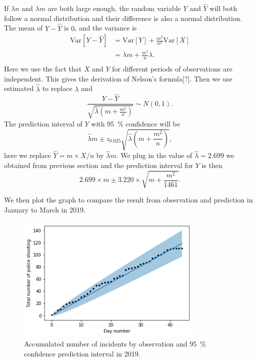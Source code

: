 \documentclass[11pt,a4paper,english]{article}
\begin{document}
If $\lambda n$ and $\lambda m$ are both large enough, the random variable $Y$ and $\hat{Y}$ will both follow a normal distribution and their difference is also a normal distribution.
The mean of $Y-\hat{Y}$ is $0$, and the variance is
\begin{align*}
	\text{Var}[Y-\hat{Y}] &= \text{Var}[Y]+\frac{m^{2}}{n^{2}}\text{Var}[X]\\
	&= \lambda m+\frac{m^{2}}{n}\lambda.\\
\end{align*}
Here we use the fact that $X$ and $Y$ for different periods of observations are independent.
This gives the derivation of Nelson's formula[?].
Then we use estimated $\hat{\lambda}$ to replace $\lambda$ and 
\begin{equation*}
	\frac{Y-\hat{Y}}{\sqrt{\hat{\lambda}\left(m+\frac{m^{2}}{n}\right)}} \sim N(0,1).
\end{equation*}
The prediction interval of $Y$ with \SI{95}{\percent} confidence will be 
\begin{equation*}
	\hat{\lambda}m \pm z_{0.025}\sqrt{\hat{\lambda}\left(m+\frac{m^{2}}{n}\right)},
\end{equation*}
here we replace $\hat{Y} = m \times X/n$ by $\hat{\lambda}m$. We plug in the value of $\hat{\lambda} = 2.699$ we obtained from previous section and the prediction interval for $Y$ is then 
\begin{equation*}
	2.699 \times m \pm 3.220 \times \sqrt{m+\frac{m^{2}}{1461}}.
\end{equation*} 

We then plot the graph to compare the result from observation and prediction in January to March in 2019.
\begin{figure}[htbp]
	\centering
	\includegraphics[width=0.8\textwidth]{predict}
	\caption{Accumulated number of incidents by observation and \SI{95}{\percent} confidence prediction interval in 2019.}
	\label{fig:predict}
\end{figure}
\end{document}
